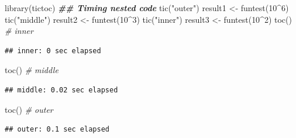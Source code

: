 \documentclass[
]{book}
\newenvironment{Shaded}{\begin{snugshade}}{\end{snugshade}}
\newcommand{\CommentTok}[1]{\textcolor[rgb]{0.56,0.35,0.01}{\textit{#1}}}
\newcommand{\DecValTok}[1]{\textcolor[rgb]{0.00,0.00,0.81}{#1}}
\newcommand{\DocumentationTok}[1]{\textcolor[rgb]{0.56,0.35,0.01}{\textbf{\textit{#1}}}}
\newcommand{\FunctionTok}[1]{\textcolor[rgb]{0.00,0.00,0.00}{#1}}
\newcommand{\NormalTok}[1]{#1}
\newcommand{\OtherTok}[1]{\textcolor[rgb]{0.56,0.35,0.01}{#1}}
\newcommand{\SpecialCharTok}[1]{\textcolor[rgb]{0.00,0.00,0.00}{#1}}
\newcommand{\StringTok}[1]{\textcolor[rgb]{0.31,0.60,0.02}{#1}}
\theoremstyle{break}
\theoremstyle{definition}
\theoremstyle{definition}
\theoremstyle{definition}
\theoremstyle{definition}
\theoremstyle{remark}
\begin{document}
\begin{Shaded}
\begin{Highlighting}[]
\FunctionTok{library}\NormalTok{(tictoc)}
\DocumentationTok{\#\# Timing nested code}
\FunctionTok{tic}\NormalTok{(}\StringTok{"outer"}\NormalTok{)}
\NormalTok{   result1 }\OtherTok{\textless{}{-}} \FunctionTok{funtest}\NormalTok{(}\DecValTok{10}\SpecialCharTok{\^{}}\DecValTok{6}\NormalTok{)}
   \FunctionTok{tic}\NormalTok{(}\StringTok{"middle"}\NormalTok{)}
\NormalTok{      result2 }\OtherTok{\textless{}{-}} \FunctionTok{funtest}\NormalTok{(}\DecValTok{10}\SpecialCharTok{\^{}}\DecValTok{3}\NormalTok{)}
      \FunctionTok{tic}\NormalTok{(}\StringTok{"inner"}\NormalTok{)}
\NormalTok{         result3 }\OtherTok{\textless{}{-}} \FunctionTok{funtest}\NormalTok{(}\DecValTok{10}\SpecialCharTok{\^{}}\DecValTok{2}\NormalTok{)}
      \FunctionTok{toc}\NormalTok{() }\CommentTok{\# inner}
\end{Highlighting}
\end{Shaded}

\begin{verbatim}
## inner: 0 sec elapsed
\end{verbatim}

\begin{Shaded}
\begin{Highlighting}[]
   \FunctionTok{toc}\NormalTok{() }\CommentTok{\# middle}
\end{Highlighting}
\end{Shaded}

\begin{verbatim}
## middle: 0.02 sec elapsed
\end{verbatim}

\begin{Shaded}
\begin{Highlighting}[]
\FunctionTok{toc}\NormalTok{() }\CommentTok{\# outer}
\end{Highlighting}
\end{Shaded}

\begin{verbatim}
## outer: 0.1 sec elapsed
\end{verbatim}
\end{document}
